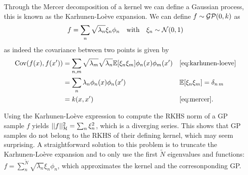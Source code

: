 Through the Mercer decomposition of a kernel we can define a Gaussian process, this is known as the Karhunen-Lo\`eve expansion. We can define $f \sim \mathcal{GP}(0, k)$ as
\begin{equation}
  \label{eq:karhunen-loeve}
    f = \sum_n \sqrt{\lambda_n} \xi_n \phi_n\quad\text{with}\quad\xi_n \sim \NormDist{0, 1}
\end{equation}
as indeed the covariance between two points is given by
\begin{align}
  \Cov(f(x), f(x')) 
  &= \sum_{n,m} \sqrt{\lambda_m} \sqrt{\lambda_n} \ExpSymb[\xi_n \xi_m] \phi_n(x) \phi_m(x') && \cref{eq:karhunen-loeve}\\
  &= \sum_n \lambda_n \phi_n(x) \phi_n(x')  &&   \ExpSymb[\xi_n \xi_m] = \delta_{n\,m}\\
  &= k(x, x') && \cref{eq:mercer}.
\end{align}

Using the  Karhunen-Lo\`eve expression to compute the RKHS norm of a GP sample $f$ yields $\lvert\lvert f\rvert\rvert^2_{{\mathcal{H}}} = \sum_{n} \xi_{n}^2$, which is a diverging series. This shows that GP samples do not belong to the RKHS of their defining kernel, which may seem surprising. A straightforward solution to this problem is to truncate the Karhunen-Lo\`eve expansion and to only use the first $\tilde{N}$ eigenvalues and functions: $f = \sum_n^{\tilde{N}} \sqrt{\lambda_n} \xi_n \phi_n$, which approximates the kernel and the corresonponding GP.


